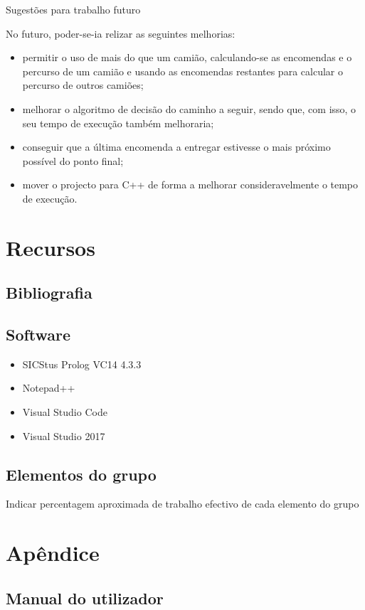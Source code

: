 \documentclass[a4paper]{article}
\begin{document}
Sugestões para trabalho futuro

No futuro, poder-se-ia relizar as seguintes melhorias:
\begin{itemize}
	\item permitir o uso de mais do que um camião, calculando-se as encomendas e o percurso de um camião e usando as encomendas restantes para calcular o percurso de outros camiões;
	\item melhorar o algoritmo de decisão do caminho a seguir, sendo que, com isso, o seu tempo de execução também melhoraria;
	\item conseguir que a última encomenda a entregar estivesse o mais próximo possível do ponto final;
	\item mover o projecto para C++ de forma a melhorar consideravelmente o tempo de execução.
\end{itemize}

\newpage

\section{Recursos}

\subsection{Bibliografia}

\subsection{Software}
\begin{itemize}
	\item SICStus Prolog VC14 4.3.3
	\item Notepad++
	\item Visual Studio Code
	\item Visual Studio 2017
\end{itemize}

\subsection{Elementos do grupo}
Indicar percentagem aproximada de trabalho efectivo de cada elemento do grupo


\clearpage
{}
\renewcommand\refname{Bibliografia}



\newpage
\appendix
\section{Apêndice}
\subsection{Manual do utilizador}
\end{document}
